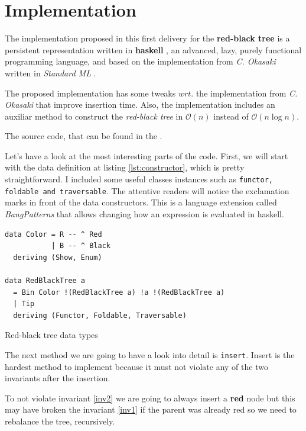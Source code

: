 \documentclass[12pt, a4paper]{article} %
\newcommand{\code}[1]{\texttt{#1}} %
\begin{document}
\section{Implementation}\label{s:implementation}

The implementation proposed in this first delivery for the \textbf{red-black tree} is a persistent representation written in \textbf{haskell} \cite{haskell}, an advanced, lazy, purely functional programming language, and based on the implementation from \textit{C. Okasaki} written in \textit{Standard ML} \cite{oka98}.

The proposed implementation has some tweaks $wrt.$ the implementation from \textit{C. Okasaki} that improve insertion time. Also, the implementation includes an auxiliar method to construct the \textit{red-black tree} in $\mathcal{O}(n)$ instead of $\mathcal{O}(n \log n)$.

The source code, that can be found in the .

Let's have a look at the most interesting parts of the code. First, we will start with the data definition at listing \ref{lst:constructor}, which is pretty straightforward. I included some useful classes instances such as \code{functor, foldable and traversable}. The attentive readers will notice the exclamation marks in front of the data constructors. This is a language extension called \textit{BangPatterns} that allows changing how an expression is evaluated in haskell.

\begin{listing}[H]
  \begin{verbatim}
data Color = R -- ^ Red
           | B -- ^ Black
  deriving (Show, Enum)

data RedBlackTree a
  = Bin Color !(RedBlackTree a) !a !(RedBlackTree a)
  | Tip
  deriving (Functor, Foldable, Traversable)
  \end{verbatim}
  \caption{Red-black tree data types}
  \label{lst:constructor}
\end{listing}

\newpage

The next method we are going to have a look into detail is \code{insert}. Insert is the hardest method to implement because it must not violate any of the two invariants after the insertion.

To not violate invariant \ref{inv2} we are going to always insert a \textbf{red} node but this may have broken the invariant \ref{inv1} if the parent was already red so we need to rebalance the tree, recursively.
\end{document}
